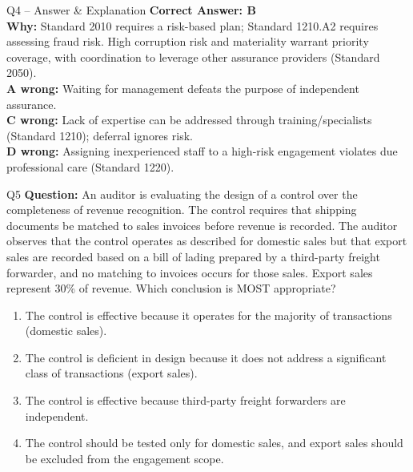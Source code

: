 \documentclass[aspectratio=169,10pt]{beamer}
\begin{document}
	\begin{frame}[t]{Q4 -- Answer \& Explanation}
		\small
		\textbf{Correct Answer: B} \\[4pt]
		\textbf{Why:} Standard 2010 requires a risk-based plan; Standard 1210.A2 requires assessing fraud risk. High corruption risk and materiality warrant priority coverage, with coordination to leverage other assurance providers (Standard 2050). \\[4pt]
		\textbf{A wrong:} Waiting for management defeats the purpose of independent assurance. \\[2pt]
		\textbf{C wrong:} Lack of expertise can be addressed through training/specialists (Standard 1210); deferral ignores risk. \\[2pt]
		\textbf{D wrong:} Assigning inexperienced staff to a high-risk engagement violates due professional care (Standard 1220).
	\end{frame}
	
	\begin{frame}[t]{Q5}
		\small
		\textbf{Question:} An auditor is evaluating the design of a control over the completeness of revenue recognition. The control requires that shipping documents be matched to sales invoices before revenue is recorded. The auditor observes that the control operates as described for domestic sales but that export sales are recorded based on a bill of lading prepared by a third-party freight forwarder, and no matching to invoices occurs for those sales. Export sales represent 30\% of revenue. Which conclusion is MOST appropriate?
		\begin{enumerate}[label=\Alph*.,itemsep=1pt,topsep=2pt]
			\item The control is effective because it operates for the majority of transactions (domestic sales).
			\item The control is deficient in design because it does not address a significant class of transactions (export sales).
			\item The control is effective because third-party freight forwarders are independent.
			\item The control should be tested only for domestic sales, and export sales should be excluded from the engagement scope.
		\end{enumerate}
	\end{frame}
	
\end{document}
